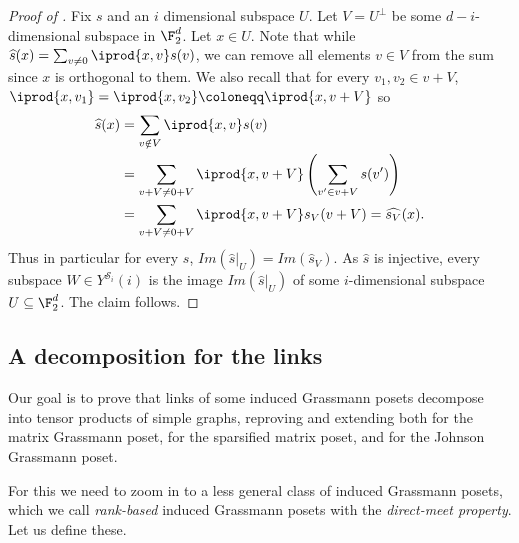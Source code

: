 \begin{proof}[Proof of ]
    Fix \(s\) and an $i$ dimensional subspace \(U\). Let \(V=U^\bot\) be some \(d-i\)-dimensional subspace in \(\F_2^d\). Let \(x \in U\). Note that while \(\widehat{s}(x) = \sum_{v\ne 0} \iprod{x,v}s(v)\), we can remove all elements \(v \in V\) from the sum since \(x\) is orthogonal to them. We also recall that for every \(v_1,v_2 \in v+V\), \(\iprod{x,v_1} = \iprod{x,v_2} \coloneqq \iprod{x,v+V}\) so
    \begin{align*}
        \widehat{s}(x) &= \sum_{v\notin V} \iprod{x,v}s(v) \\
        &=\sum_{v+V \ne 0+V} \iprod{x,v+V} \left(\sum_{v' \in v+V}s(v') \right)\\
        &= \sum_{v+V \ne 0+ V}\iprod{x,v+V} s_V(v+V) = \widehat{s_V}(x).
    \end{align*}
    Thus in particular for every \(s\), \(Im(\widehat{s}|_U) = Im(\widehat{s}_V)\). As \(\widehat{s}\) is injective, every subspace \(W \in Y^{\mathcal{S}_i}(i)\) is the image \(Im(\widehat{s}|_U)\) of some \(i\)-dimensional subspace \(U \subseteq \F_2^d\). The claim follows.
\end{proof}

\subsection{A decomposition for the links}
Our goal is to prove that links of some induced Grassmann posets decompose into tensor products of simple graphs, reproving and extending both  for the matrix Grassmann poset,  for the sparsified matrix poset, and  for the Johnson Grassmann poset.

For this we need to zoom in to a less general class of induced Grassmann posets, which we call \emph{rank-based} induced Grassmann posets with the \emph{direct-meet property}. Let us define these.

